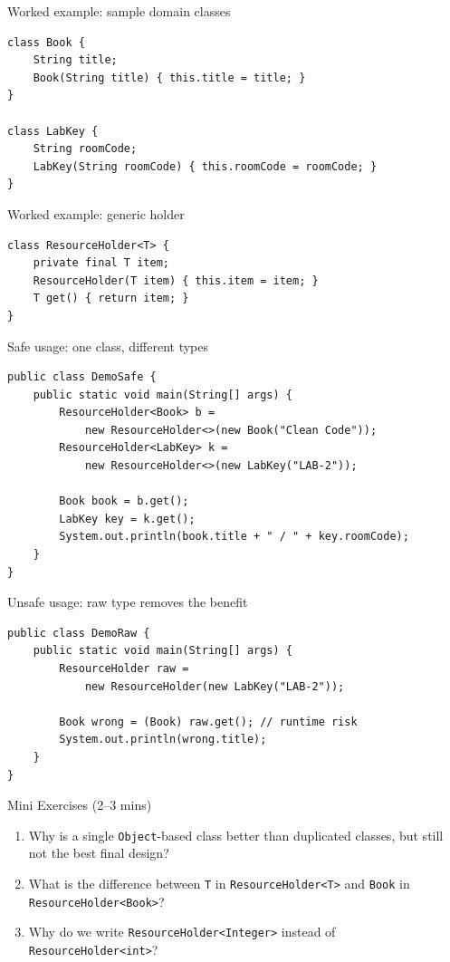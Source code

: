 \documentclass{beamer}
\begin{document}
\begin{frame}[fragile]{Worked example: sample domain classes}
\begin{lstlisting}[basicstyle=\ttfamily\small]
class Book {
    String title;
    Book(String title) { this.title = title; }
}

class LabKey {
    String roomCode;
    LabKey(String roomCode) { this.roomCode = roomCode; }
}
\end{lstlisting}
  \slidesources{\OOPSUnitIVSources}
\end{frame}

\begin{frame}[fragile]{Worked example: generic holder}
\begin{lstlisting}[basicstyle=\ttfamily\small]
class ResourceHolder<T> {
    private final T item;
    ResourceHolder(T item) { this.item = item; }
    T get() { return item; }
}
\end{lstlisting}
  \slidesources{\OOPSUnitIVSources}
\end{frame}

\begin{frame}[fragile]{Safe usage: one class, different types}
\begin{lstlisting}[basicstyle=\ttfamily\small]
public class DemoSafe {
    public static void main(String[] args) {
        ResourceHolder<Book> b =
            new ResourceHolder<>(new Book("Clean Code"));
        ResourceHolder<LabKey> k =
            new ResourceHolder<>(new LabKey("LAB-2"));

        Book book = b.get();
        LabKey key = k.get();
        System.out.println(book.title + " / " + key.roomCode);
    }
}
\end{lstlisting}
  \slidesources{\OOPSUnitIVSources}
\end{frame}

\begin{frame}[fragile]{Unsafe usage: raw type removes the benefit}
\begin{lstlisting}
public class DemoRaw {
    public static void main(String[] args) {
        ResourceHolder raw =
            new ResourceHolder(new LabKey("LAB-2"));

        Book wrong = (Book) raw.get(); // runtime risk
        System.out.println(wrong.title);
    }
}
\end{lstlisting}
  \slidesources{\OOPSUnitIVSources}
\end{frame}

\begin{frame}{Mini Exercises (2--3 mins)}
  \begin{enumerate}[<+->]
    \item Why is a single \texttt{Object}-based class better than duplicated classes, but still not the best final design?
    \item What is the difference between \texttt{T} in \texttt{ResourceHolder<T>} and \texttt{Book} in \texttt{ResourceHolder<Book>}?
    \item Why do we write \texttt{ResourceHolder<Integer>} instead of \texttt{ResourceHolder<int>}?
  \end{enumerate}
  \slidesources{\OOPSUnitIVSources}
\end{frame}
\end{document}
